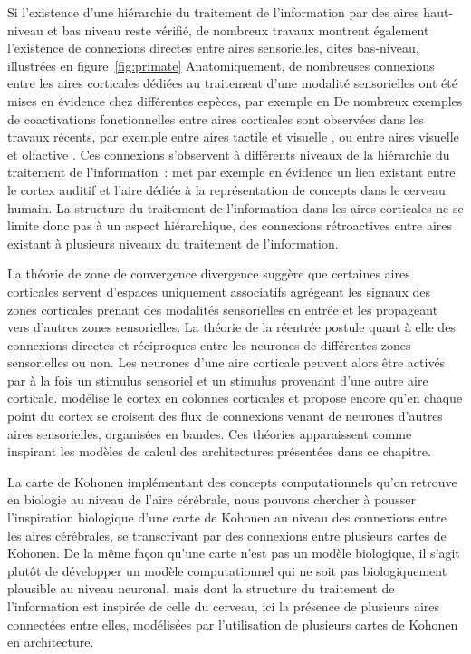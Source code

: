 \documentclass[../main]{subfiles}
\begin{document}
Si l'existence d'une hiérarchie du traitement de l'information par des aires haut-niveau et bas niveau reste vérifié, de nombreux travaux montrent également l'existence de connexions directes entre aires sensorielles, dites bas-niveau, illustrées en figure~\ref{fig:primate}
Anatomiquement, de nombreuses connexions entre les aires corticales dédiées au traitement d'une modalité sensorielles ont été mises en évidence chez différentes espèces, par exemple en \cite{Calvert2004MultisensoryIM, Cappe2009MultisensoryAP,Foxe2005TheCF,Schroeder2005MultisensoryCT}
De nombreux exemples de coactivations fonctionnelles entre aires corticales sont observées dans les travaux récents, par exemple entre aires tactile et visuelle \cite{Sathian2002FeelingWT}, ou entre aires visuelle et olfactive \cite{Gonzlez2006ReadingCA}.
Ces connexions s'observent à différents niveaux de la hiérarchie du traitement de l'information~: \cite{Kiefer2008TheSO} met par exemple en évidence un lien existant entre le cortex auditif et l'aire dédiée à la représentation de concepts dans le cerveau humain.
La structure du traitement de l'information dans les aires corticales ne se limite donc pas à un aspect hiérarchique, des connexions rétroactives entre aires existant à plusieurs niveaux du traitement de l'information.


La théorie de zone de convergence divergence \cite{damasio_time-locked_1989} suggère que certaines aires corticales servent d'espaces uniquement associatifs agrégeant les signaux des zones corticales prenant des modalités sensorielles en entrée et les propageant vers d'autres zones sensorielles. 
La théorie de la réentrée \cite{Edelman1982GroupSA} postule quant à elle des connexions directes et réciproques entre les neurones de différentes zones sensorielles ou non. Les neurones d'une aire corticale peuvent alors être activés par à la fois un stimulus sensoriel et un stimulus provenant d'une autre aire corticale.
\cite{Burnod1989AnAN} modélise le cortex en colonnes corticales et propose encore qu'en chaque point du cortex se croisent des flux de connexions venant de neurones d'autres aires sensorielles, organisées en bandes. Ces théories apparaissent comme inspirant les modèles de calcul des architectures présentées dans ce chapitre.

La carte de Kohonen implémentant des concepts computationnels qu'on retrouve en biologie au niveau de l'aire cérébrale, nous pouvons chercher à pousser l'inspiration biologique d'une carte de Kohonen au niveau des connexions entre les aires cérébrales, se transcrivant par des connexions entre plusieurs cartes de Kohonen.
De la même façon qu'une carte n'est pas un modèle biologique, il s'agit plutôt de développer un modèle computationnel qui ne soit pas biologiquement plausible au niveau neuronal, mais dont la structure du traitement de l'information est inspirée de celle du cerveau, ici la présence de plusieurs aires connectées entre elles, modélisées par l'utilisation de plusieurs cartes de Kohonen en architecture.
\end{document}
